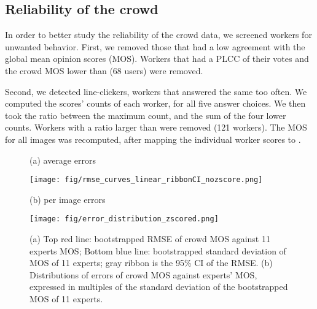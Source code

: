 \documentclass{article}
\begin{document}
\subsection{Reliability of the crowd}

In order to better study the reliability of the crowd data, we screened workers for unwanted behavior. First, we removed those that had a low agreement with the global mean opinion scores (MOS). Workers that had a PLCC of their votes and the crowd MOS lower than  (68 users) were removed.

Second, we detected line-clickers, workers that answered the same too often. We computed the scores' counts of each worker, for all five answer choices. We then took the ratio between the maximum count, and the sum of the four lower counts. Workers with a ratio larger than  were removed (121 workers). The MOS for all images was recomputed, after mapping the individual worker scores to .

\begin{figure}[!htb]
\vspace{-5pt}
\centering
\begin{minipage}{.47\linewidth}
\centerline{(a) average errors}
\centerline{\texttt{[image: fig/rmse\_curves\_linear\_ribbonCI\_nozscore.png]}}
\end{minipage}\begin{minipage}{.47\linewidth}
\centerline{(b) per image errors}
\centerline{\texttt{[image: fig/error\_distribution\_zscored.png]}}
\end{minipage}

\caption{(a) Top red line: bootstrapped RMSE of crowd  MOS against 11 experts MOS; Bottom blue line: bootstrapped standard deviation of MOS of 11 experts; gray ribbon is the 95\% CI of the RMSE. (b) Distributions of errors of crowd MOS against experts' MOS, expressed in multiples of the standard deviation of the bootstrapped MOS of 11 experts.}
\label{fig:rmse_curves}
\vspace{-9pt}
\end{figure}


\begin{table}[!htb]
\vspace{-15pt}
\caption{Performance of IQA methods.}
\label{tb:iqacomp}
\centering
{}
\end{table}
\end{document}
